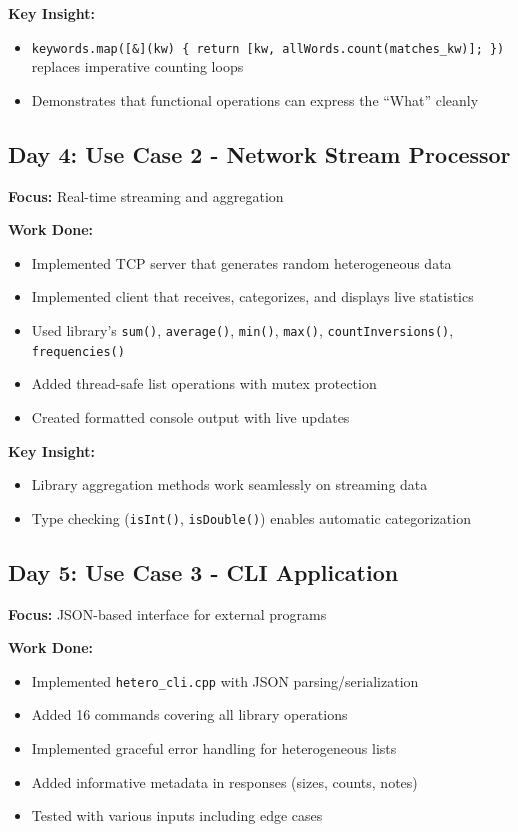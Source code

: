 \documentclass[11pt,a4paper]{article}
\begin{document}
\textbf{Key Insight:}
\begin{itemize}
    \item \texttt{keywords.map([\&](kw) \{ return [kw, allWords.count(matches\_kw)]; \})} replaces imperative counting loops
    \item Demonstrates that functional operations can express the ``What'' cleanly
\end{itemize}

\subsection{Day 4: Use Case 2 - Network Stream Processor}

\textbf{Focus:} Real-time streaming and aggregation

\textbf{Work Done:}
\begin{itemize}
    \item Implemented TCP server that generates random heterogeneous data
    \item Implemented client that receives, categorizes, and displays live statistics
    \item Used library's \texttt{sum()}, \texttt{average()}, \texttt{min()}, \texttt{max()}, \texttt{countInversions()}, \texttt{frequencies()}
    \item Added thread-safe list operations with mutex protection
    \item Created formatted console output with live updates
\end{itemize}

\textbf{Key Insight:}
\begin{itemize}
    \item Library aggregation methods work seamlessly on streaming data
    \item Type checking (\texttt{isInt()}, \texttt{isDouble()}) enables automatic categorization
\end{itemize}

\subsection{Day 5: Use Case 3 - CLI Application}

\textbf{Focus:} JSON-based interface for external programs

\textbf{Work Done:}
\begin{itemize}
    \item Implemented \texttt{hetero\_cli.cpp} with JSON parsing/serialization
    \item Added 16 commands covering all library operations
    \item Implemented graceful error handling for heterogeneous lists
    \item Added informative metadata in responses (sizes, counts, notes)
    \item Tested with various inputs including edge cases
\end{itemize}
\end{document}
